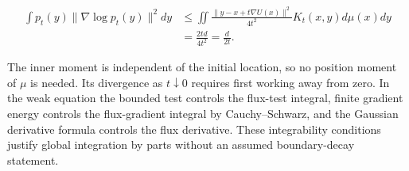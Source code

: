 \documentclass[11pt,a4paper]{article}
\begin{document}
\[\begin{aligned}
\int p_t(y)\|\nabla\log p_t(y)\|^2dy
&\le\iint\frac{\|y-x+t\nabla U(x)\|^2}{4t^2}
K_t(x,y)d\mu(x)dy\\
&=\frac{2td}{4t^2}=\frac d{2t}.
\end{aligned}\]

The inner moment is independent of the initial location, so no position moment of \(\mu\) is needed. Its divergence as \(t\downarrow0\) requires first working away from zero. In the weak equation the bounded test controls the flux-test integral, finite gradient energy controls the flux-gradient integral by Cauchy–Schwarz, and the Gaussian derivative formula controls the flux derivative. These integrability conditions justify global integration by parts without an assumed boundary-decay statement.
\end{document}

